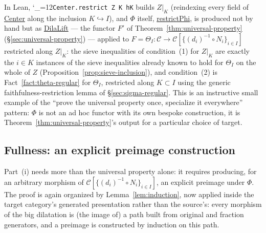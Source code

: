 \documentclass[11pt]{amsart}
\newcommand{\lc}[1]{\url{#1}}
\newcommand{\lcode}{\begingroup\catcode`\_=12\relax\lcodeInner}
\newcommand{\lcodeInner}[1]{\texttt{#1}\endgroup}
\theoremstyle{plain}
\theoremstyle{definition}
\theoremstyle{remark}
\newcommand{\calC}{\mathcal C}
\begin{document}
In Lean, \lcode{Center.restrict Z K hK} builds $Z|_K$ (reindexing every field of \lc{Center} along
the inclusion $K \hookrightarrow I$), and $\Phi$ itself, \lc{restrictPhi}, is produced not by
hand but as \lc{DilaLift} --- the functor $F'$ of Theorem~\ref{thm:universal-property}
(\S\ref{sec:universal-property}) --- applied to
$F = \Theta_I : \calC \to \calC[\{(d_i)^{-1}\circ N_i\}_{i\in I}]$ restricted along $Z|_K$: the
sieve inequalities of condition~(1) for $Z|_K$ are exactly the $i \in K$ instances of the
sieve inequalities already known to hold for $\Theta_I$ on the whole of $Z$
(Proposition~\ref{prop:sieve-inclusion}), and condition~(2) is
Fact~\ref{fact:theta-regular} for $\Theta_I$, restricted along $K \subset I$ using the generic
faithfulness-restriction lemma of \S\ref{sec:sigma-regular}. This is an instructive small
example of the ``prove the universal property once, specialize it everywhere'' pattern: $\Phi$
is not an ad hoc functor with its own bespoke construction, it is
Theorem~\ref{thm:universal-property}'s output for a particular choice of target.

\subsection{Fullness: an explicit preimage construction}

Part~(i) needs more than the universal property alone: it requires producing, for an
arbitrary morphism of $\calC[\{(d_i)^{-1}\circ N_i\}_{i\in I}]$, an explicit preimage under
$\Phi$. The proof is again organized by Lemma~\ref{lem:induction}, now applied inside the
target category's generated presentation rather than the source's: every morphism of
the big dilatation is (the image of) a path built from original and fraction generators, and
a preimage is constructed by induction on this path.
\end{document}
